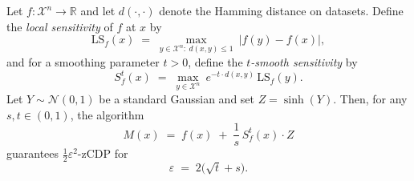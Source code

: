 Let $f:\mathcal{X}^n\to\mathbb{R}$ and let $d(\cdot,\cdot)$ denote the Hamming distance on datasets.
Define the \emph{local sensitivity} of $f$ at $x$ by
\[
\mathrm{LS}_f(x)
\;=\;
\max_{y\in\mathcal{X}^n:\ d(x,y)\le 1}\ \bigl|f(y)-f(x)\bigr|,
\]
and for a smoothing parameter $t>0$, define the \emph{$t$-smooth sensitivity} by
\[
S_f^{t}(x)
\;=\;
\max_{y\in\mathcal{X}^n}\ e^{-t\cdot d(x,y)}\,\mathrm{LS}_f(y).
\]
Let $Y\sim\mathcal{N}(0,1)$ be a standard Gaussian and set $Z=\sinh(Y)$.
Then, for any $s,t\in(0,1)$, the algorithm
\[
M(x) \;=\; f(x) \;+\; \frac{1}{s}\, S_f^{t}(x)\cdot Z
\]
guarantees $\tfrac{1}{2}\varepsilon^{2}$-zCDP for
\[
\varepsilon \;=\; 2\bigl(\sqrt{t}+s\bigr).
\]
